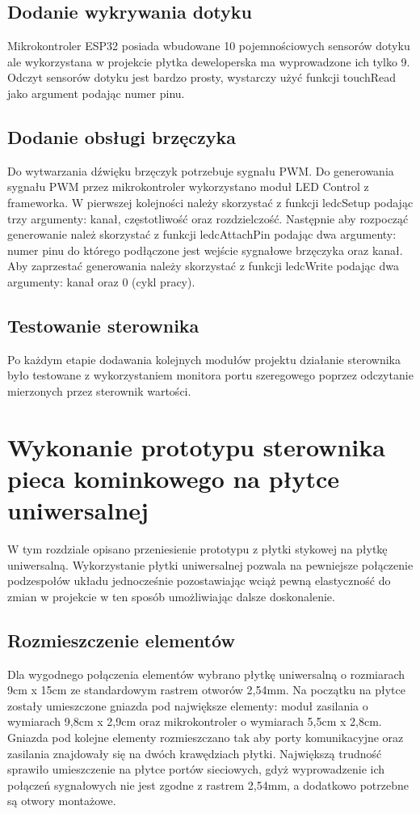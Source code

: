 \documentclass[11pt]{report}
\begin{document}
 \section{Dodanie wykrywania dotyku}
 Mikrokontroler ESP32 posiada wbudowane 10 pojemnościowych sensorów dotyku ale wykorzystana w projekcie płytka deweloperska ma wyprowadzone ich tylko 9. Odczyt sensorów dotyku jest bardzo prosty, wystarczy użyć funkcji touchRead jako argument podając numer pinu.
 
 \section{Dodanie obsługi brzęczyka}
 Do wytwarzania dźwięku brzęczyk potrzebuje sygnału PWM. Do generowania sygnału PWM przez mikrokontroler wykorzystano moduł LED Control z frameworka. W pierwszej kolejności należy skorzystać z funkcji ledcSetup podając trzy argumenty: kanał, częstotliwość oraz rozdzielczość. Następnie aby rozpocząć generowanie należ skorzystać z funkcji ledcAttachPin podając dwa argumenty: numer pinu do którego podłączone jest wejście sygnałowe brzęczyka oraz kanał.
 Aby zaprzestać generowania należy skorzystać z funkcji ledcWrite podając dwa argumenty: kanał oraz 0 (cykl pracy).
 
 \section{Testowanie sterownika}
 Po każdym etapie dodawania kolejnych modułów projektu działanie sterownika było testowane z wykorzystaniem monitora portu szeregowego poprzez odczytanie mierzonych przez sterownik wartości.

 
 \chapter{Wykonanie prototypu sterownika pieca kominkowego na płytce uniwersalnej}
 W tym rozdziale opisano przeniesienie prototypu z płytki stykowej na płytkę uniwersalną.
 Wykorzystanie płytki uniwersalnej pozwala na pewniejsze połączenie podzespołów układu jednocześnie pozostawiając wciąż pewną elastyczność do zmian w projekcie w ten sposób umożliwiając dalsze doskonalenie.
 
 \section{Rozmieszczenie elementów}
 Dla wygodnego połączenia elementów wybrano płytkę uniwersalną o rozmiarach 9cm x 15cm ze standardowym rastrem otworów 2,54mm.
 Na początku na płytce zostały umieszczone gniazda pod największe elementy: moduł zasilania o wymiarach 9,8cm x 2,9cm oraz mikrokontroler o wymiarach 5,5cm x 2,8cm. Gniazda pod kolejne elementy rozmieszczano tak aby porty komunikacyjne oraz zasilania znajdowały się na dwóch krawędziach płytki. 
 Największą trudność sprawiło umieszczenie na płytce portów sieciowych, gdyż wyprowadzenie ich połączeń sygnałowych nie jest zgodne z rastrem 2,54mm, a dodatkowo potrzebne są otwory montażowe.
  
\end{document}
